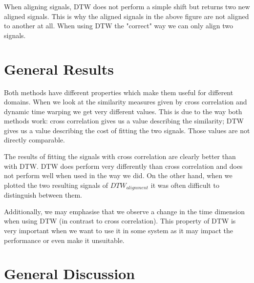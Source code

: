 \documentclass[11pt,a4paper]{article}
\begin{document}
When aligning signals, DTW does not perform a simple shift but returns two new aligned signals. This is why the aligned signals in the above figure are not aligned to another at all. When using DTW the "correct" way we can only align two signals. 

\section{General Results}

Both methods have different properties which make them useful for different domains. When we look at the similarity measures given by cross correlation and dynamic time warping we get very different values. This is due to the way both methods work: cross correlation gives us a value describing the similarity; DTW gives us a value describing the cost of fitting the two signals. Those values are not directly comparable.

The results of fitting the signals with cross correlation are clearly better than with DTW. DTW does perform very differently than cross correlation and does not perform well when used in the way we did. On the other hand, when we plotted the two resulting signals of $DTW_{alignment}$ it was often difficult to distinguish between them. 

Additionally, we may emphasise that we observe a change in the time dimension when using DTW (in contrast to cross correlation). This property of DTW is very important when we want to use it in some system as it may impact the performance or even make it unsuitable. 

\section{General Discussion}
\end{document}
